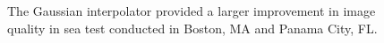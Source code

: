 \documentclass[conference]{IEEEtran}
\begin{document}
\begin{figure}[!t]
  \centering

  \hfill

  \caption{The Gaussian interpolator provided a larger improvement in image quality in sea test conducted in Boston, MA and Panama City, FL.} \label{fig:bostonPanamaCity}
\end{figure}
\end{document}
